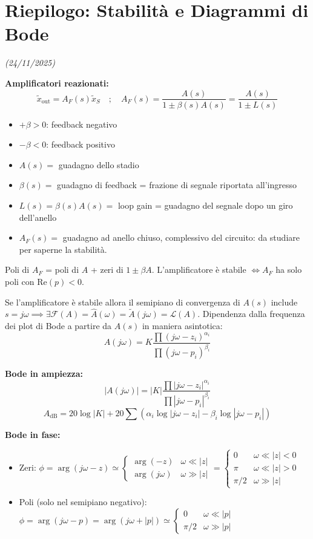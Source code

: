\documentclass[11pt,a4paper]{report}
\begin{document}
\section*{Riepilogo: Stabilità e Diagrammi di Bode}
\textit{(24/11/2025)}

\textbf{Amplificatori reazionati:}
\[
    \tilde{x}_{\text{out}} = A_F(s) \tilde{x}_S \quad ; \quad A_F(s) = \frac{A(s)}{1 \pm \beta(s) A(s)} = \frac{A(s)}{1 \pm L(s)}
\]
\begin{itemize}
    \item $+\beta > 0$: feedback negativo
    \item $-\beta < 0$: feedback positivo
    \item $A(s) =$ guadagno dello stadio
    \item $\beta(s) =$ guadagno di feedback = frazione di segnale riportata all'ingresso
    \item $L(s) = \beta(s) A(s) =$ loop gain = guadagno del segnale dopo un giro dell'anello
    \item $A_F(s) =$ guadagno ad anello chiuso, complessivo del circuito: da studiare per saperne la stabilità.
\end{itemize}

Poli di $A_F$ = poli di $A$ + zeri di $1 \pm \beta A$. L'amplificatore è stabile $\iff A_F$ ha solo poli con $\text{Re}(p) < 0$.

Se l'amplificatore è stabile allora il semipiano di convergenza di $A(s)$ include $s=j\omega \implies \exists \mathcal{F}(A) = \hat{A}(\omega) = \tilde{A}(j\omega) = \mathcal{L}(A)$. Dipendenza dalla frequenza dei plot di Bode a partire da $A(s)$ in maniera asintotica:
\[
    A(j\omega) = K \frac{\prod (j\omega - z_i)^{\alpha_i}}{\prod (j\omega - p_i)^{\beta_i}}
\]

\textbf{Bode in ampiezza:} 
\[
    |A(j\omega)| = |K| \frac{\prod |j\omega - z_i|^{\alpha_i}}{\prod |j\omega - p_i|^{\beta_i}}
\]
\[
    A_{\text{dB}} = 20 \log|K| + 20 \sum \left( \alpha_i \log|j\omega-z_i| - \beta_i \log|j\omega-p_i| \right)
\]

\textbf{Bode in fase:}
\begin{itemize}
    \item Zeri: $\phi = \arg(j\omega - z) \simeq \begin{cases} \arg(-z) & \omega \ll |z| \\ \arg(j\omega) & \omega \gg |z| \end{cases} = \begin{cases} 0 & \omega \ll |z| < 0 \\ \pi & \omega \ll |z| > 0 \\ \pi/2 & \omega \gg |z| \end{cases}$
    \item Poli (solo nel semipiano negativo): $\phi = \arg(j\omega - p) = \arg(j\omega + |p|) \simeq \begin{cases} 0 & \omega \ll |p| \\ \pi/2 & \omega \gg |p| \end{cases}$
\end{itemize}
\end{document}
